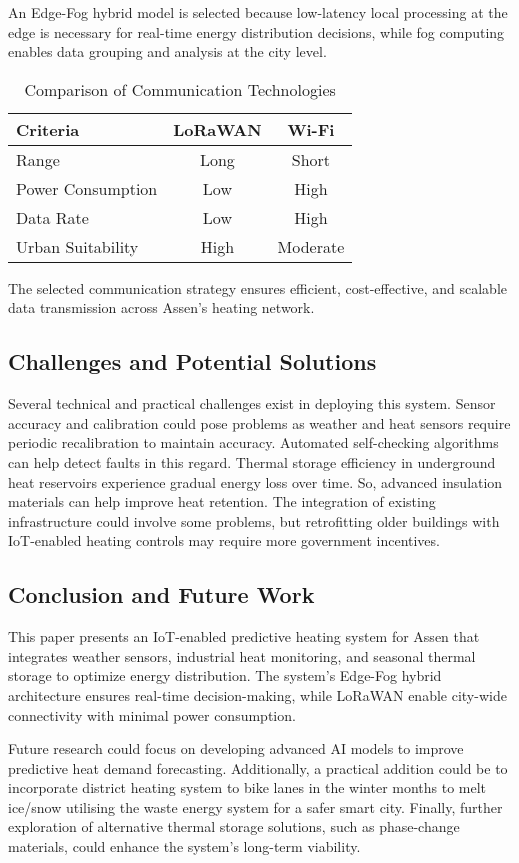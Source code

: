\documentclass{article}
\begin{document}
An Edge-Fog hybrid model is selected because low-latency local processing at the edge is necessary for real-time energy distribution decisions, while fog computing enables data grouping and analysis at the city level.

\begin{table}[h]
\centering
\caption{Comparison of Communication Technologies}
\begin{tabular}{|l|c|c|}
\hline
\textbf{Criteria} & \textbf{LoRaWAN} & \textbf{Wi-Fi} \\
\hline
Range & Long & Short \\
Power Consumption & Low & High \\
Data Rate & Low & High \\
Urban Suitability & High & Moderate \\
\hline
\end{tabular}
\end{table}

The selected communication strategy ensures efficient, cost-effective, and scalable data transmission across Assen’s heating network.

\subsection{Challenges and Potential Solutions}

Several technical and practical challenges exist in deploying this system. Sensor accuracy and calibration could pose problems as weather and heat sensors require periodic recalibration to maintain accuracy. Automated self-checking algorithms can help detect faults in this regard. Thermal storage efficiency in underground heat reservoirs experience gradual energy loss over time. So, advanced insulation materials can help improve heat retention. The integration of existing infrastructure could involve some problems, but retrofitting older buildings with IoT-enabled heating controls may require more government incentives.

\subsection{Conclusion and Future Work}

This paper presents an IoT-enabled predictive heating system for Assen that integrates weather sensors, industrial heat monitoring, and seasonal thermal storage to optimize energy distribution. The system’s Edge-Fog hybrid architecture ensures real-time decision-making, while LoRaWAN enable city-wide connectivity with minimal power consumption.

Future research could focus on developing advanced AI models to improve predictive heat demand forecasting. Additionally, a practical addition could be to incorporate district heating system to bike lanes in the winter months to melt ice/snow utilising the waste energy system for a safer smart city. Finally, further exploration of alternative thermal storage solutions, such as phase-change materials, could enhance the system’s long-term viability.



\end{document}
